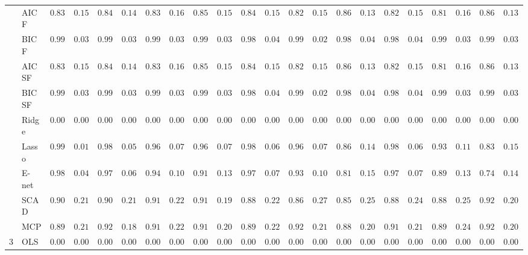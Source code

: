 \begin{tabular}{llllllllllllllllllllll}
	& AIC F  & $0.8317$ & $0.1526$ & $0.8483$ & $0.1443$ & $0.8367$ & $0.1606$ & $0.8500$ & $0.1544$ & $0.8450$ & $0.1503$ & $0.8233$ & $0.1514$ & $0.8683$ & $0.1387$ & $0.8267$ & $0.1570$ & $0.8167$ & $0.1683$ & $0.8633$ & $0.1369$ \\
	& BIC F  & $0.9917$ & $0.0365$ & $0.9900$ & $0.0398$ & $0.9917$ & $0.0365$ & $0.9900$ & $0.0398$ & $0.9883$ & $0.0427$ & $0.9950$ & $0.0286$ & $0.9883$ & $0.0489$ & $0.9883$ & $0.0489$ & $0.9933$ & $0.0328$ & $0.9900$ & $0.0398$ \\
	& AIC SF  & $0.8317$ & $0.1526$ & $0.8483$ & $0.1443$ & $0.8367$ & $0.1606$ & $0.8500$ & $0.1544$ & $0.8450$ & $0.1503$ & $0.8233$ & $0.1514$ & $0.8683$ & $0.1387$ & $0.8267$ & $0.1570$ & $0.8167$ & $0.1683$ & $0.8633$ & $0.1369$ \\
	& BIC SF  & $0.9917$ & $0.0365$ & $0.9900$ & $0.0398$ & $0.9917$ & $0.0365$ & $0.9900$ & $0.0398$ & $0.9883$ & $0.0427$ & $0.9950$ & $0.0286$ & $0.9883$ & $0.0489$ & $0.9883$ & $0.0489$ & $0.9933$ & $0.0328$ & $0.9900$ & $0.0398$ \\
	& Ridge  & $0.0000$ & $0.0000$ & $0.0000$ & $0.0000$ & $0.0000$ & $0.0000$ & $0.0000$ & $0.0000$ & $0.0000$ & $0.0000$ & $0.0000$ & $0.0000$ & $0.0000$ & $0.0000$ & $0.0000$ & $0.0000$ & $0.0000$ & $0.0000$ & $0.0000$ & $0.0000$ \\
	& Lasso  & $0.9983$ & $0.0167$ & $0.9850$ & $0.0535$ & $0.9683$ & $0.0775$ & $0.9600$ & $0.0754$ & $0.9833$ & $0.0691$ & $0.9683$ & $0.0738$ & $0.8650$ & $0.1492$ & $0.9800$ & $0.0639$ & $0.9383$ & $0.1102$ & $0.8317$ & $0.1562$ \\
	& E-net  & $0.9883$ & $0.0427$ & $0.9783$ & $0.0611$ & $0.9467$ & $0.1002$ & $0.9117$ & $0.1329$ & $0.9750$ & $0.0763$ & $0.9333$ & $0.1086$ & $0.8167$ & $0.1580$ & $0.9733$ & $0.0739$ & $0.8917$ & $0.1306$ & $0.7450$ & $0.1469$ \\
	& SCAD  & $0.9000$ & $0.2145$ & $0.9017$ & $0.2146$ & $0.9133$ & $0.2228$ & $0.9167$ & $0.1975$ & $0.8850$ & $0.2256$ & $0.8617$ & $0.2763$ & $0.8583$ & $0.2556$ & $0.8850$ & $0.2492$ & $0.8817$ & $0.2510$ & $0.9217$ & $0.2002$ \\
	& MCP  & $0.8983$ & $0.2144$ & $0.9283$ & $0.1869$ & $0.9100$ & $0.2228$ & $0.9133$ & $0.2085$ & $0.8900$ & $0.2238$ & $0.9250$ & $0.2137$ & $0.8817$ & $0.2069$ & $0.9100$ & $0.2124$ & $0.8900$ & $0.2453$ & $0.9200$ & $0.2017$ \\
	3 & OLS  & $0.0000$ & $0.0000$ & $0.0000$ & $0.0000$ & $0.0000$ & $0.0000$ & $0.0000$ & $0.0000$ & $0.0000$ & $0.0000$ & $0.0000$ & $0.0000$ & $0.0000$ & $0.0000$ & $0.0000$ & $0.0000$ & $0.0000$ & $0.0000$ & $0.0000$ & $0.0000$ \\

\end{tabular}
